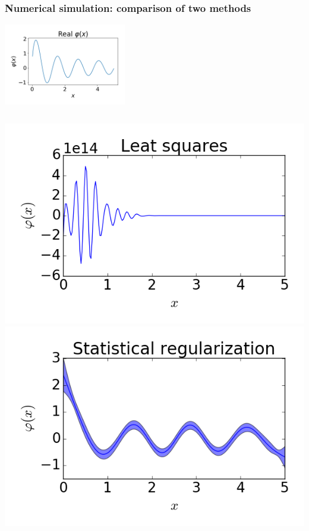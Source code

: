 \documentclass[8pt,pdf,hyperref={unicode}]{beamer}
\begin{document}
\begin{frame}
    \frametitle{Numerical simulation: comparison of two methods}
 \begin{center}
        \includegraphics[width=0.4\textwidth, height=0.4\textheight]{image/fig01.png}
    \end{center}
    \begin{columns}
        \includegraphics[width=1\textwidth]{image/fig05.png}
        \includegraphics[width=1\textwidth]{image/fig06.png}
    \end{columns}
\end{frame}
\end{document}
